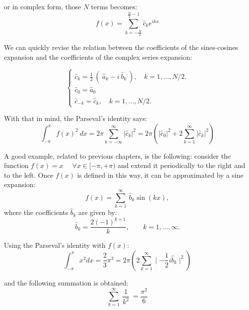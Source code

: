 or in complex form, those $N$ terms becomes:
\begin{equation} 
    f ( x)  =  \sum_{k=-\frac{N}{2}} ^{\frac{N}{2}-1}  \hat{c}_k  e^{ i k x }
\end{equation} 

We can quickly revise the relation between the coefficients of the sines-cosines expansion and the coefficients of the complex series expansion:  

$$
\begin{cases}
    \hat{c}_k  =  \frac{1}{2} \ ( \ \hat{a}_k  - i \ \hat{b}_k \ ),  \quad k=1, \ldots, N/2.   \\
    \hat{c}_0  = \hat{a}_0   \\
    \hat{c}_{-k}  =  \overline{ \hat{c} } _{k}  , \quad k=1, \ldots, N/2. 
\end{cases}
$$

With that in mind, the Parseval's identity says:
\begin{equation} 
	\int _{-\pi} ^{\pi} f(x)^2 \ dx =  2 \pi  \sum_{k=-\infty} ^{\infty}  | \hat{c}_k | ^2       =  2 \pi \left(    | \hat{c}_0 |^2 + 2 \sum_{k=1} ^{\infty} |  \hat{c}_k  |^2 \right) 
\end{equation} 





A good example, related to previous chapters, is the following: consider the function $ f(x) = x \quad $ $ \forall x \in [-\pi, +\pi ) $ and extend it periodically to the right and to the left. Once $ f(x) $ is defined in this way, it can be approximated by a sine expansion: 
\begin{equation} 
	f ( x )  =  \sum_{k=1} ^{\infty} \   \hat{b}_k  \sin \left(  kx\right), 
\end{equation} 
where the coefficients $ \hat{b}_k $ are given by:
\begin{equation} 
    \hat{b}_k   = \frac{ 2 (-1)^{k+1} }{ k }, \qquad k=1, \ldots,\infty. 
\end{equation} 

Using the Parseval's identity with $f(x)$:
$$
\int_{-\pi}^{\pi}  x^2 dx  = \frac{2}{3} \pi^3 = 2\pi \left(   2\sum_{k=1}^{\infty}  \mid  -\frac{1}{2} i \hat{b}_k   \mid ^2  \right)
$$

and the following summation is obtained: 
\begin{equation} 
    \sum_{k=1} ^{\infty} \  \frac{1}{k^2}  \  = \frac{\pi^2}{6}
\end{equation}



